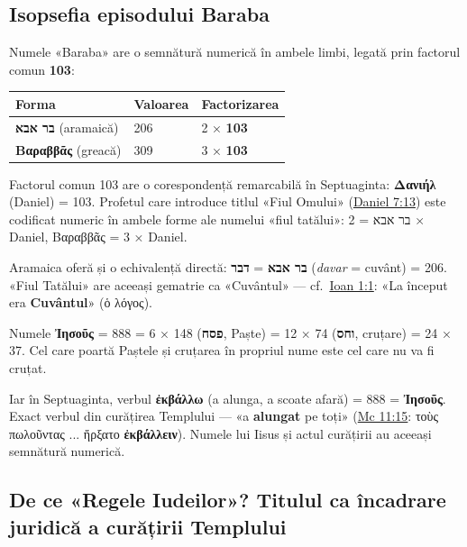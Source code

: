 \documentclass[12pt,a4paper,twoside,openany]{book}
\begin{document}
\subsection{Isopsefia episodului Baraba}

Numele «Baraba» are o semnătură numerică în ambele limbi, legată prin factorul comun \textbf{103}:

\begin{center}
\small
\begin{tabularx}{\textwidth}{L{4cm}L{3cm}X}
\toprule
{}
\textbf{Forma} & \textbf{Valoarea} & \textbf{Factorizarea} \\
\midrule
\textbf{בר אבא} (aramaică) & 206 & 2 × \textbf{103} \\
\textbf{Βαραββᾶς} (greacă) & 309 & 3 × \textbf{103} \\
\bottomrule
\end{tabularx}
\end{center}

Factorul comun 103 are o corespondență remarcabilă în Septuaginta: \textbf{Δανιήλ} (Daniel) = 103. Profetul care introduce titlul «Fiul Omului» (\href{https://bibliaortodoxa.ro/carte.php?id=37\&cap=7\#13}{Daniel 7:13}) este codificat numeric în ambele forme ale numelui «fiul tatălui»: בר אבא = 2 × Daniel, Βαραββᾶς = 3 × Daniel.

Aramaica oferă și o echivalență directă: \textbf{בר אבא} = \textbf{דבר} (\textit{davar} = cuvânt) = 206. «Fiul Tatălui» are aceeași gematrie ca «Cuvântul» — cf.\ \href{https://bibliaortodoxa.ro/carte.php?id=35\&cap=1\#1}{Ioan 1:1}: «La început era \textbf{Cuvântul}» (ὁ λόγος).

Numele \textbf{Ἰησοῦς} = 888 = 6 × 148 (\textbf{פסח}, Paște) = 12 × 74 (\textbf{וחס}, cruțare) = 24 × 37. Cel care poartă Paștele și cruțarea în propriul nume este cel care nu va fi cruțat.

Iar în Septuaginta, verbul \textbf{ἐκβάλλω} (a alunga, a scoate afară) = 888 = \textbf{Ἰησοῦς}. Exact verbul din curățirea Templului — «a \textbf{alungat} pe toți» (\href{https://bibliaortodoxa.ro/carte.php?id=53\&cap=11\#15}{Mc 11:15}: τοὺς πωλοῦντας ... ἤρξατο \textbf{ἐκβάλλειν}). Numele lui Iisus și actul curățirii au aceeași semnătură numerică.

\subsection{De ce «Regele Iudeilor»? Titulul ca încadrare juridică a curățirii Templului}
\label{sec:titulus_crucis}
\end{document}
